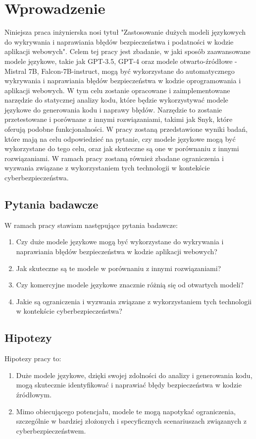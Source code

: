 

\chapter*{Wprowadzenie}

Niniejsza praca inżynierska nosi tytuł "Zastosowanie dużych modeli językowych do wykrywania i naprawiania błędów bezpieczeństwa i podatności w kodzie aplikacji webowych". Celem tej pracy jest zbadanie, w jaki sposób zaawansowane modele językowe, takie jak GPT-3.5, GPT-4 oraz modele otwarto-źródłowe - Mistral 7B, Falcon-7B-instruct, mogą być wykorzystane do automatycznego wykrywania i naprawiania błędów bezpieczeństwa w kodzie oprogramowania i aplikacji webowych. 
W tym celu zostanie opracowane i zaimplementowane narzędzie do statycznej analizy kodu, które będzie wykorzystywać modele językowe do generowania kodu i naprawy błędów.
Narzędzie to zostanie przetestowane i porównane z innymi rozwiązaniami, takimi jak Snyk, które oferują podobne funkcjonalności.
W pracy zostaną przedstawione wyniki badań, które mają na celu odpowiedzieć na pytanie, czy modele językowe mogą być wykorzystane do tego celu, oraz jak skuteczne są one w porównaniu z innymi rozwiązaniami.
W ramach pracy zostaną również zbadane ograniczenia i wyzwania związane z wykorzystaniem tych technologii w kontekście cyberbezpieczeństwa.

\section*{Pytania badawcze}
W ramach pracy stawiam następujące pytania badawcze:
\begin{enumerate}
    \item Czy duże modele językowe mogą być wykorzystane do wykrywania i naprawiania błędów bezpieczeństwa w kodzie aplikacji webowych?
    \item Jak skuteczne są te modele w porównaniu z innymi rozwiązaniami?
    \item Czy komercyjne modele językowe znacznie różnią się od otwartych modeli?
    \item Jakie są ograniczenia i wyzwania związane z wykorzystaniem tych technologii w kontekście cyberbezpieczeństwa?
\end{enumerate}

\section*{Hipotezy}
Hipotezy pracy to:
\begin{enumerate}
    \item Duże modele językowe, dzięki swojej zdolności do analizy i generowania kodu, mogą skutecznie identyfikować i naprawiać błędy bezpieczeństwa w kodzie źródłowym.
    \item Mimo obiecującego potencjału, modele te mogą napotykać ograniczenia, szczególnie w bardziej złożonych i specyficznych scenariuszach związanych z cyberbezpieczeństwem.
\end{enumerate}

